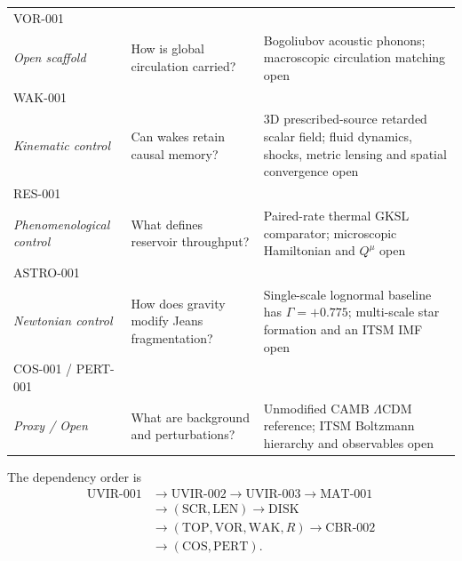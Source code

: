 \begin{center}
\begin{tabular}{@{}p{}p{}p{}@{}}
VOR-001\\\textit{Open scaffold} & How is global circulation carried? & Bogoliubov acoustic phonons; macroscopic circulation matching open \\
WAK-001\\\textit{Kinematic control} & Can wakes retain causal memory? & 3D prescribed-source retarded scalar field; fluid dynamics, shocks, metric lensing and spatial convergence open \\
RES-001\\\textit{Phenomenological control} & What defines reservoir throughput? & Paired-rate thermal GKSL comparator; microscopic Hamiltonian and $Q^\mu$ open \\
ASTRO-001\\\textit{Newtonian control} & How does gravity modify Jeans fragmentation? & Single-scale lognormal baseline has $\Gamma=+0.775$; multi-scale star formation and an ITSM IMF open \\
COS-001 / PERT-001\\\textit{Proxy / Open} & What are background and perturbations? & Unmodified CAMB $\Lambda\mathrm{CDM}$ reference; ITSM Boltzmann hierarchy and observables open \\
\bottomrule
\end{tabular}
\end{center}

The dependency order is
\begin{align}
 \mathrm{UVIR\mbox{-}001}&\to\mathrm{UVIR\mbox{-}002}
 \to\mathrm{UVIR\mbox{-}003}\to\mathrm{MAT\mbox{-}001}\nonumber\\
 &\to(\mathrm{SCR},\mathrm{LEN})\to\mathrm{DISK}\nonumber\\
 &\to(\mathrm{TOP},\mathrm{VOR},\mathrm{WAK},R)
 \to\mathrm{CBR\mbox{-}002}\nonumber\\
 &\to(\mathrm{COS},\mathrm{PERT}).
\end{align}

